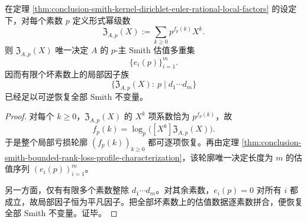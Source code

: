 \begin{corollary}\label{cor:conclusion-smith-local-zeta-complete-invariant}
在定理 \ref{thm:conclusion-smith-kernel-dirichlet-euler-rational-local-factors} 的设定下，对每个素数 \(p\) 定义形式幂级数
\[
\mathfrak Z_{A,p}(X):=\sum_{k\ge 0}p^{f_p(k)}X^k.
\]
则 \(\mathfrak Z_{A,p}(X)\) 唯一决定 \(A\) 的 \(p\)-主 Smith 估值多重集
\[
\{e_i(p)\}_{i=1}^{m}.
\]
因而有限个坏素数上的局部因子族
\[
\{\mathfrak Z_{A,p}(X):\ p\mid d_1\cdots d_m\}
\]
已经足以可逆恢复全部 Smith 不变量。
\end{corollary}
\begin{proof}
对每个 \(k\ge 0\)，\(\mathfrak Z_{A,p}(X)\) 的 \(X^k\) 项系数恰为 \(p^{f_p(k)}\)，故
\[
f_p(k)=\log_p\!\bigl([X^k]\mathfrak Z_{A,p}(X)\bigr).
\]
于是整个局部亏损轮廓 \((f_p(k))_{k\ge 0}\) 都可逐项恢复。再由定理 \ref{thm:conclusion-smith-bounded-rank-loss-profile-characterization}，该轮廓唯一决定长度为 \(m\) 的估值序列 \((e_i(p))_{i=1}^{m}\)。

另一方面，仅有有限多个素数整除 \(d_1\cdots d_m\)。对其余素数，\(e_i(p)=0\) 对所有 \(i\) 都成立，故局部因子恒为平凡因子。把全部坏素数上的估值数据逐素数拼合，便恢复全部 Smith 不变量。证毕。
\end{proof}


